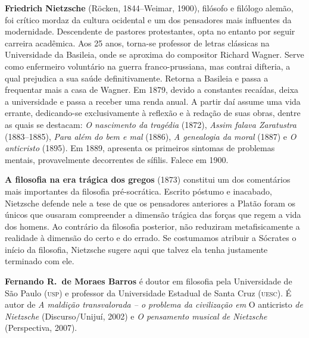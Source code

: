 \vspace*{7cm}

\noindent\textbf{Friedrich Nietzsche} (Röcken, 1844--Weimar, 1900), filósofo 
e filólogo alemão, foi crítico mordaz da cultura ocidental 
e um dos pensadores mais influentes da modernidade. Descendente de pastores 
protestantes, opta no entanto por seguir carreira acadêmica. 
Aos 25 anos, torna-se professor de letras clássicas na Universidade 
da Basileia, onde se aproxima do compositor Richard Wagner. Serve 
como enfermeiro voluntário na guerra franco-prussiana, mas contrai 
difteria, a qual prejudica a sua saúde definitivamente. Retorna a 
Basileia e passa a frequentar mais a casa de Wagner. Em 
1879, devido a constantes recaídas, deixa a universidade e passa a 
receber uma renda anual. A partir daí assume uma vida errante, 
dedicando-se exclusivamente à reflexão e à redação de suas obras, 
dentre as quais se destacam: \textit{O nascimento da tragédia} (1872), 
\textit{Assim falava Zaratustra} (1883--1885), \textit{Para além do bem e mal} (1886), 
\textit{A genealogia da moral} (1887) e \textit{O anticristo} (1895). Em 1889, 
apresenta os primeiros sintomas de problemas mentais, provavelmente 
decorrentes de sífilis. Falece em 1900.

\noindent\textbf{A filosofia na era trágica dos gregos} (1873) constitui um dos comentários 
mais importantes da filosofia pré{}-socrática. Escrito póstumo e inacabado, Nietzsche defende nele 
a tese de que os pensadores anteriores a Platão foram os únicos que ousaram compreender a dimensão 
trágica das forças que regem a vida dos homens. Ao contrário da filosofia posterior, não reduziram 
metafisicamente a realidade à dimensão do certo e do errado. Se costumamos atribuir a Sócrates o início 
da filosofia, Nietzsche sugere aqui que talvez ela tenha justamente terminado com ele.

\noindent\textbf{Fernando R.~de Moraes Barros} é doutor em filosofia pela Universidade 
de São Paulo (\textsc{usp}) e professor da Universidade Estadual de Santa Cruz 
(\textsc{uesc}). É autor de \textit{A maldição transvalorada -- o problema da civilização 
em} O anticristo \textit{de Nietzsche} (Discurso/Unijuí, 2002) 
e \textit{O pensamento musical de Nietzsche} (Perspectiva, 2007).


\clearpage